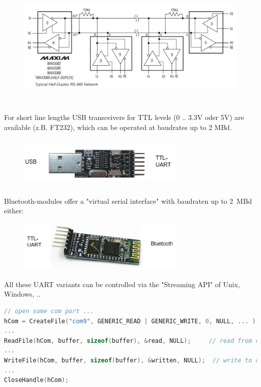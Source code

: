     \begin{figure}[h]
    \centering
    \includegraphics[width=15cm, height=6cm]{Images/image48.png}
    \label{fig:Fig 145}
    \end{figure}
    
For short line lengths USB transceivers for TTL levels (0 .. 3.3V oder 5V) are available (z.B. FT232), which can be operated at baudrates up to 2 MBd.

    \begin{figure}[h]
    \centering
    \includegraphics[width=8cm, height=2.5cm]{Images/image49.png}
    \label{fig:Fig 146}
    \end{figure}

Bluetooth-modules offer a "virtual serial interface" with baudraten up to 2~MBd either:

    \begin{figure}[h]
    \centering
    \includegraphics[width=8cm, height=2.5cm]{Images/image50.png}
    \label{fig:Fig 147}
    \end{figure}

All these UART variants can be controlled via the "Streaming API" of Unix, Windows, .. \\

\begin{lstlisting}[style=mystyle, language=c]
// open some com port ... 
hCom = CreateFile("com9", GENERIC_READ | GENERIC_WRITE, 0, NULL, ... );
...
ReadFile(hCom, buffer, sizeof(buffer), &read, NULL);     // read from com port
...
WriteFile(hCom, buffer, sizeof(buffer), &written, NULL);  // write to com port
...
CloseHandle(hCom);
\end{lstlisting}
\newpage

